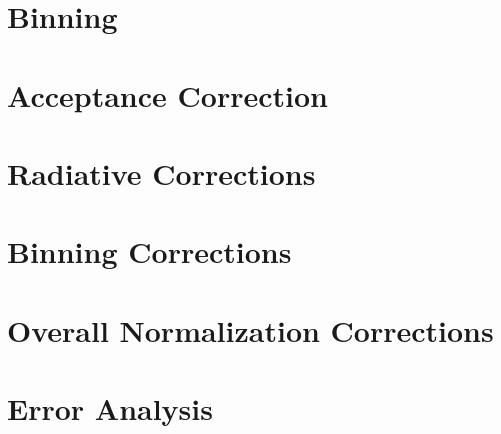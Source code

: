 \section{Binning}

\section{Acceptance Correction}

\section{Radiative Corrections}

\section{Binning Corrections}

\section{Overall Normalization Corrections}

\section{Error Analysis}

